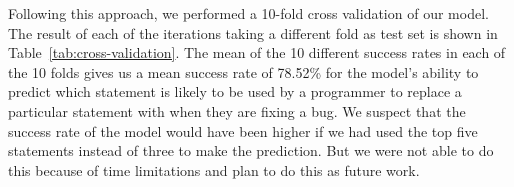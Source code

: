 
Following this approach, we performed a 10-fold cross validation of our model. The result of each of the iterations taking a different fold as test set is shown in Table~\ref{tab:cross-validation}. The mean of the 10 different success rates in each of the 10 folds gives us a mean success rate of 78.52\% for the model's ability to predict which statement is likely to be used by a programmer to replace a particular statement with when they are fixing a bug. We suspect that the success rate of the model would have been higher if we had used the top five statements instead of three to make the prediction. But we were not able to do this because of time limitations and plan to do this as future work.

\begin{table*}
	\centering
\caption{10-fold cross validation of the probabilistic model}
\label{tab:cross-validation}
\end{table*}
